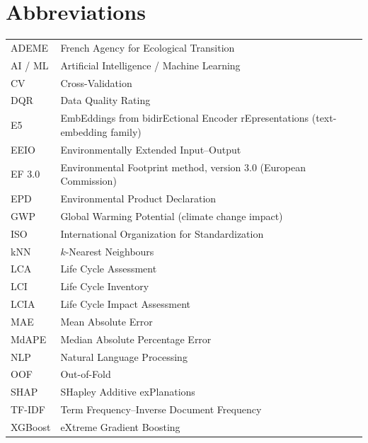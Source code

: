 \chapter*{Abbreviations}
\begin{tabular}{@{}ll@{}}
ADEME & French Agency for Ecological Transition \\
AI / ML & Artificial Intelligence / Machine Learning \\
CV & Cross-Validation \\
DQR & Data Quality Rating \\
E5 & EmbEddings from bidirEctional Encoder rEpresentations (text-embedding family) \\
EEIO & Environmentally Extended Input--Output \\
EF 3.0 & Environmental Footprint method, version 3.0 (European Commission) \\
EPD & Environmental Product Declaration \\
GWP & Global Warming Potential (climate change impact) \\
ISO & International Organization for Standardization \\
kNN & $k$-Nearest Neighbours \\
LCA & Life Cycle Assessment \\
LCI & Life Cycle Inventory \\
LCIA & Life Cycle Impact Assessment \\
MAE & Mean Absolute Error \\
MdAPE & Median Absolute Percentage Error \\
NLP & Natural Language Processing \\
OOF & Out-of-Fold \\
SHAP & SHapley Additive exPlanations \\
TF-IDF & Term Frequency--Inverse Document Frequency \\
XGBoost & eXtreme Gradient Boosting \\
\end{tabular}
